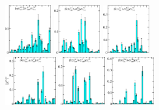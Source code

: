 \begin{figure}[H]
    \includegraphics[width=0.18\textwidth]{figures/sigmas/hu/zfactors/zfactor_isotriplet_eta_sigma-Hu_1-P010-A2p-SS_1-P0-10-G1-SS_0.pdf}
    \includegraphics[width=0.18\textwidth]{figures/sigmas/hu/zfactors/zfactor_isotriplet_kbar_delta-Hu_1-P000-A1u-SS_0-P000-Hg-SS_0.pdf}
    \includegraphics[width=0.18\textwidth]{figures/sigmas/hu/zfactors/zfactor_isotriplet_kbar_delta-Hu_1-P001-A2-SS_1-P00-1-G2-SS_0.pdf}\\
    \includegraphics[width=0.1975\textwidth]{figures/sigmas/hu/zfactors/zfactor_isotriplet_kbar_delta-Hu_1-P010-A2-SS_1-P0-10-G1-SS_0.pdf}
    \includegraphics[width=0.18\textwidth]{figures/sigmas/hu/zfactors/zfactor_isotriplet_kbar_nucleon-Hu_1-CG_1-P011-A2-SS_0-P0-1-1-G-SS_0.pdf}
    \includegraphics[width=0.18\textwidth]{figures/sigmas/hu/zfactors/zfactor_isotriplet_kbar_nucleon-Hu_1-P000-T1u-SS_1-P000-G1g-SS_0.pdf}

\end{figure}
